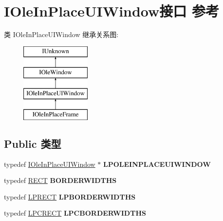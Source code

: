 \hypertarget{interface_i_ole_in_place_u_i_window}{}\section{I\+Ole\+In\+Place\+U\+I\+Window接口 参考}
\label{interface_i_ole_in_place_u_i_window}
类 I\+Ole\+In\+Place\+U\+I\+Window 继承关系图\+:\begin{figure}[H]
\begin{center}
\leavevmode
\includegraphics[height=4.000000cm]{interface_i_ole_in_place_u_i_window}
\end{center}
\end{figure}
\subsection*{Public 类型}
\begin{DoxyCompactItemize}
\item 
\mbox{\label{interface_i_ole_in_place_u_i_window_a6463fecfd9f73741610ee955f9517bc9}} 
typedef \hyperlink{interface_i_ole_in_place_u_i_window}{I\+Ole\+In\+Place\+U\+I\+Window} $\ast$ {\bfseries L\+P\+O\+L\+E\+I\+N\+P\+L\+A\+C\+E\+U\+I\+W\+I\+N\+D\+OW}
\item 
\mbox{\label{interface_i_ole_in_place_u_i_window_a15a188d5c207bad4ad9698b943cd050d}} 
typedef \hyperlink{structtag_r_e_c_t}{R\+E\+CT} {\bfseries B\+O\+R\+D\+E\+R\+W\+I\+D\+T\+HS}
\item 
\mbox{\label{interface_i_ole_in_place_u_i_window_a142635a523d3f08ebf9b93f596468b46}} 
typedef \hyperlink{structtag_r_e_c_t}{L\+P\+R\+E\+CT} {\bfseries L\+P\+B\+O\+R\+D\+E\+R\+W\+I\+D\+T\+HS}
\item 
\mbox{\label{interface_i_ole_in_place_u_i_window_acdc736b83d740a0281fde75b957f5d63}} 
typedef \hyperlink{structtag_r_e_c_t}{L\+P\+C\+R\+E\+CT} {\bfseries L\+P\+C\+B\+O\+R\+D\+E\+R\+W\+I\+D\+T\+HS}
\end{DoxyCompactItemize}

